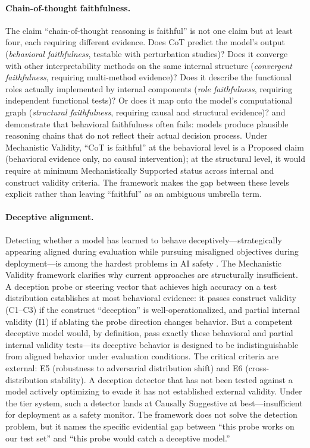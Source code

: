 \documentclass{article}
\begin{document}
\paragraph{Chain-of-thought faithfulness.}
The claim ``chain-of-thought reasoning is faithful'' is not one claim but at least four, each requiring different evidence.  Does CoT predict the model's output (\emph{behavioral faithfulness}, testable with perturbation studies)?  Does it converge with other interpretability methods on the same internal structure (\emph{convergent faithfulness}, requiring multi-method evidence)?  Does it describe the functional roles actually implemented by internal components (\emph{role faithfulness}, requiring independent functional tests)?  Or does it map onto the model's computational graph (\emph{structural faithfulness}, requiring causal and structural evidence)?  \citet{lanham2023measuring} and \citet{turpin2024unfaithful} demonstrate that behavioral faithfulness often fails: models produce plausible reasoning chains that do not reflect their actual decision process.  Under Mechanistic Validity, ``CoT is faithful'' at the behavioral level is a Proposed claim (behavioral evidence only, no causal intervention); at the structural level, it would require at minimum Mechanistically Supported status across internal and construct validity criteria.  The framework makes the gap between these levels explicit rather than leaving ``faithful'' as an ambiguous umbrella term.

\paragraph{Deceptive alignment.}
Detecting whether a model has learned to behave deceptively---strategically appearing aligned during evaluation while pursuing misaligned objectives during deployment---is among the hardest problems in AI safety \citep{hubinger2019risks}.  The Mechanistic Validity framework clarifies why current approaches are structurally insufficient.  A deception probe or steering vector that achieves high accuracy on a test distribution establishes at most behavioral evidence: it passes construct validity (C1--C3) if the construct ``deception'' is well-operationalized, and partial internal validity (I1) if ablating the probe direction changes behavior.  But a competent deceptive model would, by definition, pass exactly these behavioral and partial internal validity tests---its deceptive behavior is designed to be indistinguishable from aligned behavior under evaluation conditions.  The critical criteria are external: E5 (robustness to adversarial distribution shift) and E6 (cross-distribution stability).  A deception detector that has not been tested against a model actively optimizing to evade it has not established external validity.  Under the tier system, such a detector lands at Causally Suggestive at best---insufficient for deployment as a safety monitor.  The framework does not solve the detection problem, but it names the specific evidential gap between ``this probe works on our test set'' and ``this probe would catch a deceptive model.''
\end{document}

